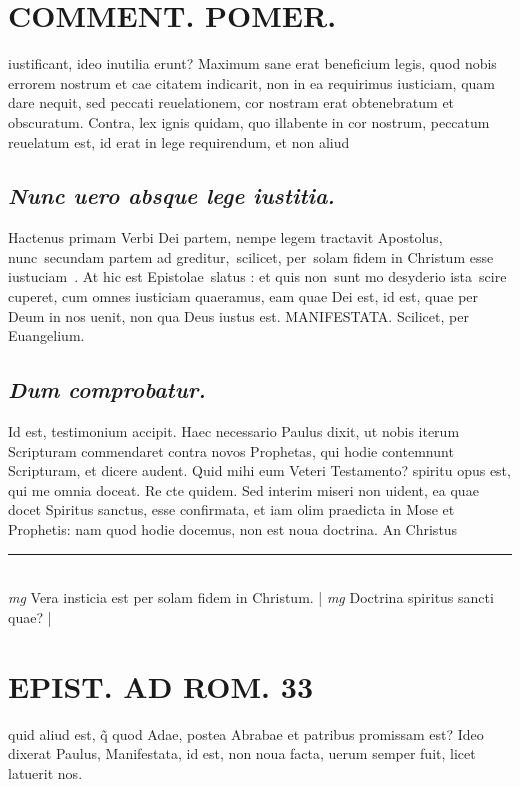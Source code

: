 \documentclass{article}
\begin{document}
\begin{pages}
\section*{COMMENT. POMER.  }\pstart iustificant, ideo inutilia erunt? Maximum sane erat beneficium legis, quod nobis errorem nostrum et cae citatem indicarit, non in ea requirimus iusticiam, quam dare nequit, sed peccati reuelationem, cor nostram erat obtenebratum et obscuratum. Contra, lex ignis quidam, quo illabente in cor nostrum, peccatum reuelatum est, id erat in lege requirendum, et non aliud\pend
{}
{}
\subsection*{\textit{Nunc uero absque lege iustitia. }}\pstart Hactenus primam Verbi Dei partem, nempe legem tractavit Apostolus, nunc secundam partem ad greditur, scilicet, per solam fidem in Christum esse iustuciam . At hic est Epistolae slatus : et quis non sunt mo desyderio ista scire cuperet, cum omnes iusticiam quaeramus, eam quae Dei est, id est, quae per Deum in nos uenit, non qua Deus iustus est. MANIFESTATA. Scilicet, per Euangelium.   \pend
{}
{}
\subsection*{\textit{Dum comprobatur. }}\pstart Id est, testimonium accipit. Haec necessario Paulus dixit, ut nobis iterum Scripturam commendaret contra novos Prophetas, qui hodie contemnunt Scripturam, et dicere audent. Quid mihi eum Veteri Testamento? spiritu opus est, qui me omnia doceat. Re cte quidem. Sed interim miseri non uident, ea quae docet Spiritus sanctus, esse confirmata, et iam olim praedicta in Mose et Prophetis: nam quod hodie docemus, non est noua doctrina. An Christus  \pend
\vspace{0.5cm}\noindent
\vspace{0.2cm}\rule{1cm}{0.2pt}\\ 
\hspace{0.2cm}\textit{mg}
\footnotesize Vera insticia est per solam fidem in Christum.  
\normalsize| 
\hspace{0.2cm}\textit{mg}
\footnotesize Doctrina spiritus sancti quae? 
\normalsize| 
\section*{EPIST. AD ROM.  33 }
\marginpar{[ p.]}\pstart quid aliud est, q̃ quod Adae, postea Abrabae et patribus promissam est? Ideo dixerat Paulus, Manifestata, id est, non noua facta, uerum semper fuit, licet latuerit nos.   \pend
{}
{}

\end{pages}
\end{document}
